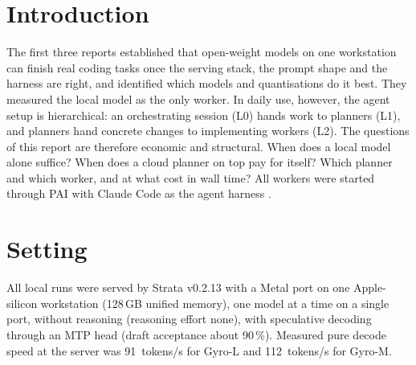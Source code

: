 
\tableofcontents
{}
\listoftables
\clearpage

\renewcommand{\sectionmark}[1]{\markboth{\thesection.\ #1}{\thesection.\ #1}}
\renewcommand{\subsectionmark}[1]{}
\clearpage


\section{Introduction}\label{sec:intro}

The first three reports established that open-weight models on one workstation can finish real coding tasks once
the serving stack, the prompt shape and the harness are right, and identified which models and quantisations do it
best. They measured the local model as the only worker. In daily use, however, the agent setup is hierarchical: an
orchestrating session (L0) hands work to planners (L1), and planners hand concrete changes to implementing
workers (L2). The questions of this report are therefore economic and structural. When does a local model alone
suffice? When does a cloud planner on top pay for itself? Which planner and which worker, and at what cost in wall
time? All workers were started through PAI \citep{Nott-2026aa} with Claude Code as the agent harness
\citep{Anthropic-2026aa}.

\section{Setting}\label{sec:setting}

All local runs were served by Strata v0.2.13 with a Metal port on one Apple-silicon workstation (128\,GB unified
memory), one model at a time on a single port, without reasoning (reasoning effort none), with speculative
decoding through an MTP head (draft acceptance about 90\,\%). Measured pure decode speed at the server was
91~tokens/s for Gyro-L and 112~tokens/s for Gyro-M.

